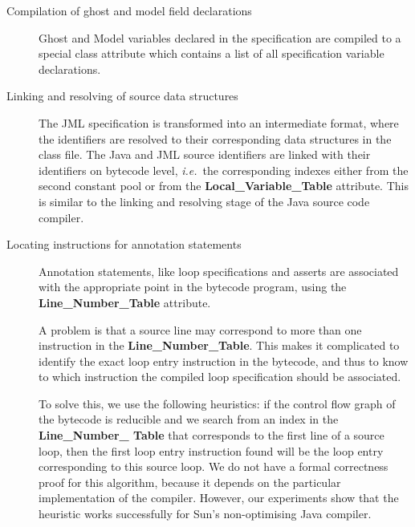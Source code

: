 \begin{description}

\item[Compilation of ghost and model field declarations] 
Ghost and Model variables declared in the specification are
compiled to a special class attribute 
 which contains a list of all  specification variable declarations. 


\item[Linking and resolving of source data structures]
The JML specification is transformed into an intermediate format,
where the identifiers are resolved to their corresponding data
structures in the class file.  The Java and JML source identifiers are
linked with their identifiers on bytecode level, \emph{i.e.}\ the
corresponding indexes either from the second constant pool or from the
\textbf{Local\_Variable\_Table} attribute. This is similar to the
linking and resolving stage of the Java source code compiler.

\item[Locating instructions for annotation statements] 
Annotation statements, like loop specifications and asserts are
associated with the appropriate point in the bytecode program, using
the \textbf{Line\_Number\_Table} attribute.

A problem is that a source line may correspond to more than
one instruction in the \textbf{Line\_Number\_Table}. This makes it
complicated to identify the exact loop entry instruction in the
bytecode, and thus to know to which instruction the compiled loop
specification should be associated. 
 
To solve this, we use the following heuristics: if the control
flow graph of the bytecode is reducible and we search from an index
in the \textbf{Line\_Number\_ Table} that corresponds to the first line
of a source loop, then the first loop entry instruction found will be
the loop entry corresponding to this source loop.  We do not have a
formal correctness proof for this algorithm, because it depends on the
particular implementation of the compiler.  However, our experiments
show that the heuristic works successfully for Sun's non-optimising
Java compiler.
 

\end{description}

